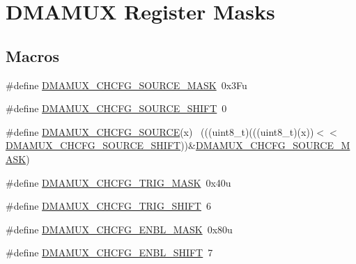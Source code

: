 \hypertarget{group___d_m_a_m_u_x___register___masks}{}\section{D\+M\+A\+M\+UX Register Masks}
\label{group___d_m_a_m_u_x___register___masks}
\subsection*{Macros}
\begin{DoxyCompactItemize}
\item 
\#define \hyperlink{group___d_m_a_m_u_x___register___masks_ga35b279ba0b1c9e817901494cdac305c5}{D\+M\+A\+M\+U\+X\+\_\+\+C\+H\+C\+F\+G\+\_\+\+S\+O\+U\+R\+C\+E\+\_\+\+M\+A\+SK}~0x3\+Fu
\item 
\#define \hyperlink{group___d_m_a_m_u_x___register___masks_gac2b7553c4599d8e919750598dd03f8a3}{D\+M\+A\+M\+U\+X\+\_\+\+C\+H\+C\+F\+G\+\_\+\+S\+O\+U\+R\+C\+E\+\_\+\+S\+H\+I\+FT}~0
\item 
\#define \hyperlink{group___d_m_a_m_u_x___register___masks_ga7e6dbf37a88078ee1e84987e92d737db}{D\+M\+A\+M\+U\+X\+\_\+\+C\+H\+C\+F\+G\+\_\+\+S\+O\+U\+R\+CE}(x)                                  ~(((uint8\+\_\+t)(((uint8\+\_\+t)(x))$<$$<$\hyperlink{group___d_m_a_m_u_x___register___masks_gac2b7553c4599d8e919750598dd03f8a3}{D\+M\+A\+M\+U\+X\+\_\+\+C\+H\+C\+F\+G\+\_\+\+S\+O\+U\+R\+C\+E\+\_\+\+S\+H\+I\+FT}))\&\hyperlink{group___d_m_a_m_u_x___register___masks_ga35b279ba0b1c9e817901494cdac305c5}{D\+M\+A\+M\+U\+X\+\_\+\+C\+H\+C\+F\+G\+\_\+\+S\+O\+U\+R\+C\+E\+\_\+\+M\+A\+SK})
\item 
\#define \hyperlink{group___d_m_a_m_u_x___register___masks_gafd2b6158f86bedffb640e73c40cdd0f5}{D\+M\+A\+M\+U\+X\+\_\+\+C\+H\+C\+F\+G\+\_\+\+T\+R\+I\+G\+\_\+\+M\+A\+SK}~0x40u
\item 
\#define \hyperlink{group___d_m_a_m_u_x___register___masks_ga714a6b142fde49d701e3f624bb2417e1}{D\+M\+A\+M\+U\+X\+\_\+\+C\+H\+C\+F\+G\+\_\+\+T\+R\+I\+G\+\_\+\+S\+H\+I\+FT}~6
\item 
\#define \hyperlink{group___d_m_a_m_u_x___register___masks_ga311ccb0a9a00f29da44f8c41b33ba79f}{D\+M\+A\+M\+U\+X\+\_\+\+C\+H\+C\+F\+G\+\_\+\+E\+N\+B\+L\+\_\+\+M\+A\+SK}~0x80u
\item 
\#define \hyperlink{group___d_m_a_m_u_x___register___masks_ga23d6f41370761b5c68e4d49f419aaee9}{D\+M\+A\+M\+U\+X\+\_\+\+C\+H\+C\+F\+G\+\_\+\+E\+N\+B\+L\+\_\+\+S\+H\+I\+FT}~7
\end{DoxyCompactItemize}


